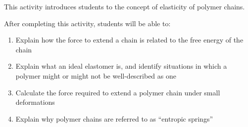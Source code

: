 %
%
%
%

\renewcommand{\figpath}{content/polymphys/chain-confs/chain-elasticity/figs}
\renewcommand{\labelbase}{chain-elasticity}

\begin{activity}

\begin{instructornotes}

	This activity introduces students to the concept of elasticity of polymer chains.
	
	After completing this activity, students will be able to:
			\begin{enumerate}
				\item Explain how the force to extend a chain is related to the free energy of the chain
				\item Explain what an ideal elastomer is, and identify situations in which a polymer might or might not be well-described as one
				\item Calculate the force required to extend a polymer chain under small deformations
				\item Explain why polymer chains are referred to as ``entropic springs''
			\end{enumerate}
	
			

\end{instructornotes}
\end{activity}
